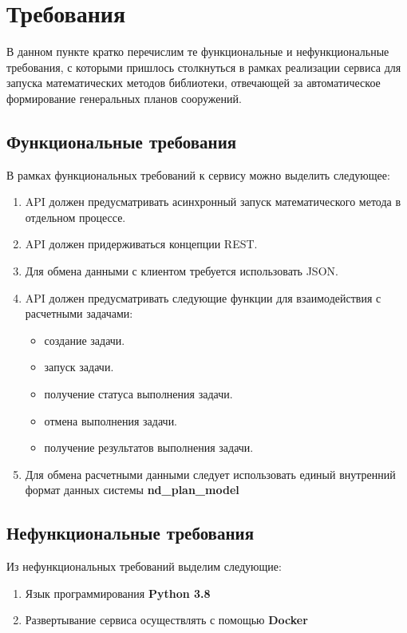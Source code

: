 \section*{\Large{Требования}}

В данном пункте кратко перечислим те функциональные и нефункциональные требования, с которыми пришлось столкнуться
в рамках реализации сервиса для запуска математических методов библиотеки, отвечающей за автоматическое формирование
генеральных планов сооружений.

\subsection*{\large{Функциональные требования}}

В рамках функциональных требований к сервису можно выделить следующее:
\begin{enumerate}
    \item API должен предусматривать асинхронный запуск математического метода в отдельном процессе.
    \item API должен придерживаться концепции REST.
    \item Для обмена данными с клиентом требуется использовать JSON.
    \item API должен предусматривать следующие функции для взаимодействия с расчетными задачами:
    \begin{itemize}
        \item создание задачи.
        \item запуск задачи.
        \item получение статуса выполнения задачи.
        \item отмена выполнения задачи.
        \item получение результатов выполнения задачи.
    \end{itemize}
    \item Для обмена расчетными данными следует использовать единый внутренний формат данных системы \textbf{nd_plan_model}

\end{enumerate}

\subsection*{\large{Нефункциональные требования}}

Из нефункциональных требований выделим следующие:
\begin{enumerate}
    \item Язык программирования \textbf{Python 3.8}
    \item Развертывание сервиса осуществлять с помощью \textbf{Docker}
\end{enumerate}
